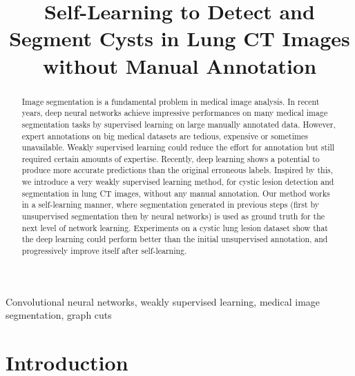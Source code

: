 \documentclass{article}
\title{Self-Learning to Detect and Segment Cysts in Lung CT Images without Manual Annotation}
\begin{document}
%
\maketitle
%
\begin{abstract}
Image segmentation is a fundamental problem in medical image analysis. In recent years, deep neural networks achieve impressive performances on many medical image segmentation tasks by supervised learning on large manually annotated data. However, expert annotations on big medical datasets are tedious, expensive or sometimes unavailable. Weakly supervised learning could reduce the effort for annotation but still required certain amounts of expertise. Recently, deep learning shows a potential to produce more accurate predictions than the original erroneous labels. Inspired by this, we introduce a very weakly supervised learning method, for cystic lesion detection and segmentation in lung CT images, without any manual annotation. Our method works in a self-learning manner, where segmentation generated in previous steps (first by unsupervised segmentation then by neural networks) is used as ground truth for the next level of network learning. Experiments on a cystic lung lesion dataset show that the deep learning could perform better than the initial unsupervised annotation, and progressively improve itself after self-learning.
\end{abstract}
%
\begin{keywords}
Convolutional neural networks, weakly supervised learning, medical image segmentation, graph cuts
\end{keywords}
%

\section{Introduction}
\label{sec:intro}
\end{document}
